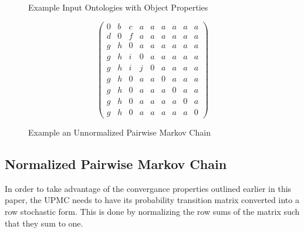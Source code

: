 \documentclass[letterpaper,twocolumn,12pt]{article}
\begin{document}
\begin{figure*}
\centering
\SetVertexNormal[
	Shape = circle,
    LineWidth = 1pt
]
\SetUpEdge[
	lw = 1pt,
    color = orange,
    labelcolor = white
]
\caption{Example Input Ontologies with Object Properties}
\label{fig:input}
\end{figure*}

\begin{figure*}
\begin{equation*}
\left( \begin{array}{ccccccccc}
0 & b & c & a & a & a & a & a & a \\
d & 0 & f & a & a & a & a & a & a \\
g & h & 0 & a & a & a & a & a & a \\
g & h & i & 0 & a & a & a & a & a \\
g & h & i & j & 0 & a & a & a & a \\
g & h & 0 & a & a & 0 & a & a & a \\
g & h & 0 & a & a & a & 0 & a & a \\
g & h & 0 & a & a & a & a & 0 & a \\
g & h & 0 & a & a & a & a & a & 0 \end{array} \right)
\end{equation*}
\caption{Example an Unnormalized Pairwise Markov Chain}
\label{fig:upmc}
\end{figure*}

\subsection{Normalized Pairwise Markov Chain}

In order to take advantage of the convergance properties outlined earlier in this paper, the UPMC needs to have its probability transition matrix converted into a row stochastic form. 
This is done by normalizing the row sums of the matrix such that they sum to one.
\end{document}
